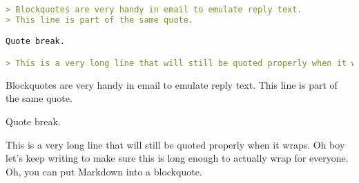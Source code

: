 \documentclass[a4paper, 11pt]{gfm}
\begin{document}
\begin{lstlisting}[language=Markdown]
> Blockquotes are very handy in email to emulate reply text.
> This line is part of the same quote.

Quote break.

> This is a very long line that will still be quoted properly when it wraps. Oh boy let's keep writing to make sure this is long enough to actually wrap for everyone. Oh, you can *put* **Markdown** into a blockquote.
\end{lstlisting}
\begin{blockquote}
Blockquotes are very handy in email to emulate reply text. This line is part of the same quote.
\end{blockquote}

Quote break.

\begin{blockquote}
This is a very long line that will still be quoted properly when it wraps. Oh boy let's keep writing to make sure this is long enough to actually wrap for everyone. Oh, you can put Markdown into a blockquote.
\end{blockquote}
\end{document}
